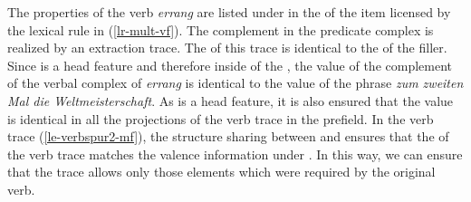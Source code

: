 The properties of the verb \emph{errang} are listed under \dsl in the \compsv of the item licensed
by the lexical rule in (\ref{lr-mult-vf}). The complement in the predicate complex  is
realized by an extraction trace. The \localv of this trace  is identical to the \localv
of the filler. Since \dsl is a head feature and therefore inside of the \localv, the \dsl value of
the complement of the verbal complex of \emph{errang} is identical to the \dsl value of the phrase 
\emph{zum zweiten Mal die Weltmeisterschaft}. As \dsl is a head feature, it is also ensured that the 
\dsl value is identical in all the projections of the verb trace in the prefield. In the verb trace
(\ref{le-verbspur2-mf}), the structure sharing between \local and \dsl ensures that the \compsv of the verb trace
matches the valence information under \dsl. In this way, we can ensure that the trace allows only those elements
which were required by the original verb.

